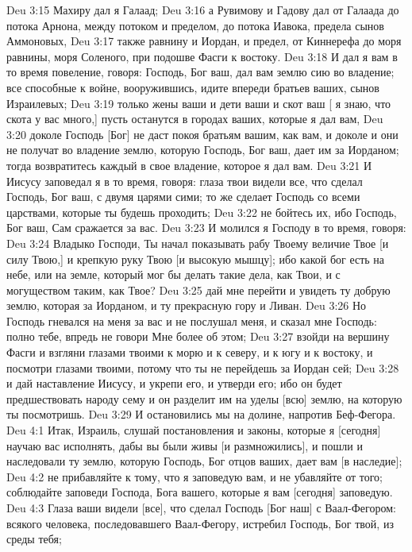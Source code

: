 \vs Deu 3:15 Махиру дал я Галаад;
\vs Deu 3:16 а  Рувимову и Гадову дал от Галаада до потока Арнона,  между потоком и пределом, до потока Иавока, предела сынов Аммоновых,
\vs Deu 3:17 также равнину и Иордан,  и предел, от Киннерефа до моря равнины, моря Соленого, при подошве  Фасги к востоку.
\vs Deu 3:18 И дал я вам в то время повеление, говоря: Господь, Бог ваш, дал вам землю сию во владение; все способные к войне, вооружившись, идите впереди братьев ваших, сынов Израилевых;
\vs Deu 3:19 только жены ваши и дети ваши и скот ваш [ я знаю, что скота у вас много,] пусть останутся в городах ваших, которые я дал вам,
\vs Deu 3:20 доколе Господь [Бог] не даст покоя братьям вашим, как вам, и доколе и они не получат во владение землю, которую Господь, Бог ваш, дает им за Иорданом; тогда возвратитесь каждый в свое владение, которое я дал вам.
\vs Deu 3:21 И Иисусу заповедал я в то время, говоря: глаза твои видели все, что сделал Господь, Бог ваш, с двумя царями сими; то же сделает Господь со всеми царствами, которые ты будешь проходить;
\vs Deu 3:22 не бойтесь их, ибо Господь, Бог ваш, Сам сражается за вас.
\vs Deu 3:23 И молился я Господу в то время, говоря:
\vs Deu 3:24 Владыко Господи, Ты начал показывать рабу Твоему величие Твое [и силу Твою,] и крепкую руку Твою [и высокую мышцу]; ибо какой бог есть на небе, или на земле, который мог бы делать такие дела, как Твои, и с могуществом таким, как Твое?
\vs Deu 3:25 дай мне перейти и увидеть ту добрую землю, которая за Иорданом, и ту прекрасную гору и Ливан.
\vs Deu 3:26 Но Господь гневался на меня за вас и не послушал меня, и сказал мне Господь: полно тебе, впредь не говори Мне более об этом;
\vs Deu 3:27 взойди на вершину Фасги и взгляни глазами твоими к морю и к северу, и к югу и к востоку, и посмотри глазами твоими, потому что ты не перейдешь за Иордан сей;
\vs Deu 3:28 и дай наставление Иисусу, и укрепи его, и утверди его; ибо он будет предшествовать народу сему и он разделит им на уделы [всю] землю, на которую ты посмотришь.
\vs Deu 3:29 И остановились мы на долине, напротив Беф-Фегора.
\vs Deu 4:1 Итак, Израиль, слушай постановления и законы, которые я [сегодня] научаю вас исполнять, дабы вы были живы [и размножились], и пошли и наследовали ту землю, которую Господь, Бог отцов ваших, дает вам [в наследие];
\vs Deu 4:2 не прибавляйте к тому, что я заповедую вам, и не убавляйте от того; соблюдайте заповеди Господа, Бога вашего, которые я вам [сегодня] заповедую.
\vs Deu 4:3 Глаза ваши видели [все], что сделал Господь [Бог наш] с Ваал-Фегором: всякого человека, последовавшего Ваал-Фегору, истребил Господь, Бог твой, из среды тебя;
